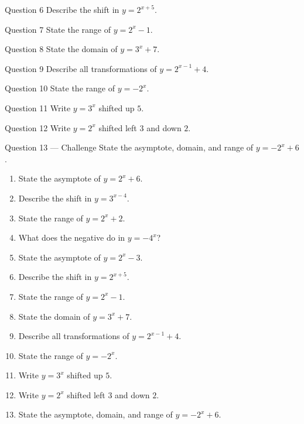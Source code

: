 \documentclass[11pt]{article}
\begin{document}
\begin{qbox}{Question 6}
Describe the shift in $y=2^{x+5}$.\workspace{2.4cm}
\end{qbox}

\begin{qbox}{Question 7}
State the range of $y=2^{x}-1$.\workspace{2.4cm}
\end{qbox}

\begin{qbox}{Question 8}
State the domain of $y=3^{x}+7$.\workspace{2.4cm}
\end{qbox}

\begin{qbox}{Question 9}
Describe all transformations of $y=2^{x-1}+4$.\workspace{3cm}
\end{qbox}

\begin{qbox}{Question 10}
State the range of $y=-2^{x}$.\workspace{2.4cm}
\end{qbox}

\begin{qbox}{Question 11}
Write $y=3^{x}$ shifted up $5$.\workspace{2.4cm}
\end{qbox}

\begin{qbox}{Question 12}
Write $y=2^{x}$ shifted left $3$ and down $2$.\workspace{2.4cm}
\end{qbox}

\begin{qbox}{Question 13 --- Challenge}
State the asymptote, domain, and range of $y=-2^{x}+6$.\workspace{3cm}
\end{qbox}

\clearpage
{}

\begin{recapbox}
\begin{multicols}{2}
\small
\begin{enumerate}[leftmargin=*,itemsep=3pt]
  \item State the asymptote of $y=2^{x}+6$.
  \item Describe the shift in $y=3^{x-4}$.
  \item State the range of $y=2^{x}+2$.
  \item What does the negative do in $y=-4^{x}$?
  \item State the asymptote of $y=2^{x}-3$.
  \item Describe the shift in $y=2^{x+5}$.
  \item State the range of $y=2^{x}-1$.
  \item State the domain of $y=3^{x}+7$.
  \item Describe all transformations of $y=2^{x-1}+4$.
  \item State the range of $y=-2^{x}$.
  \item Write $y=3^{x}$ shifted up $5$.
  \item Write $y=2^{x}$ shifted left $3$ and down $2$.
  \item State the asymptote, domain, and range of $y=-2^{x}+6$.
\end{enumerate}
\end{multicols}
\end{recapbox}
\end{document}
